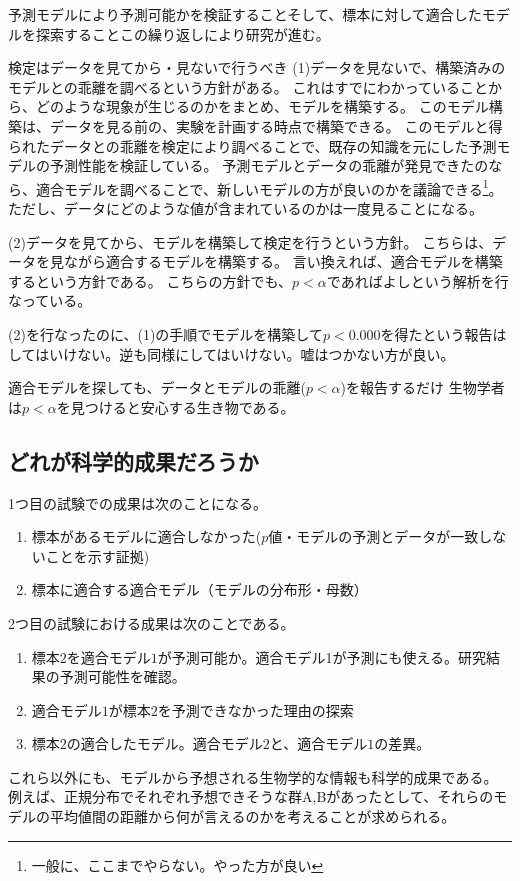 予測モデルにより予測可能かを検証することそして、標本に対して適合したモデルを探索することこの繰り返しにより研究が進む。


\begin{SMbox}{検定はデータを見てから・見ないで行うべき}
    (1)データを見ないで、構築済みのモデルとの乖離を調べるという方針がある。
    これはすでにわかっていることから、どのような現象が生じるのかをまとめ、モデルを構築する。
    このモデル構築は、データを見る前の、実験を計画する時点で構築できる。
    このモデルと得られたデータとの乖離を検定により調べることで、既存の知識を元にした予測モデルの予測性能を検証している。
    予測モデルとデータの乖離が発見できたのなら、適合モデルを調べることで、新しいモデルの方が良いのかを議論できる\footnote{一般に、ここまでやらない。やった方が良い}。
    ただし、データにどのような値が含まれているのかは一度見ることになる。

    (2)データを見てから、モデルを構築して検定を行うという方針。
    こちらは、データを見ながら適合するモデルを構築する。
    言い換えれば、適合モデルを構築するという方針である。
    こちらの方針でも、$p<\alpha$であればよしという解析を行なっている。
    
    
    (2)を行なったのに、(1)の手順でモデルを構築して$p<0.000$を得たという報告はしてはいけない。逆も同様にしてはいけない。嘘はつかない方が良い。
\end{SMbox}

\begin{SMbox}{適合モデルを探しても、データとモデルの乖離($p<\alpha$)を報告するだけ}
    生物学者は$p<\alpha$を見つけると安心する生き物である。
\end{SMbox}


\subsection{どれが科学的成果だろうか}
1つ目の試験での成果は次のことになる。
\begin{enumerate}
    \item 標本があるモデルに適合しなかった($p$値・モデルの予測とデータが一致しないことを示す証拠)
    \item 標本に適合する適合モデル（モデルの分布形・母数）
\end{enumerate}

2つ目の試験における成果は次のことである。
\begin{enumerate}
    \item 標本$2$を適合モデル$1$が予測可能か。適合モデル1が予測にも使える。研究結果の予測可能性を確認。
    \item 適合モデル$1$が標本$2$を予測できなかった理由の探索
    \item 標本$2$の適合したモデル。適合モデル$2$と、適合モデル$1$の差異。
\end{enumerate}
これら以外にも、モデルから予想される生物学的な情報も科学的成果である。
例えば、正規分布でそれぞれ予想できそうな群A,Bがあったとして、それらのモデルの平均値間の距離から何が言えるのかを考えることが求められる。



